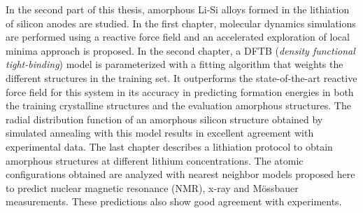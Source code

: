 In the second part of this thesis, amorphous Li-Si alloys formed in the 
lithiation of silicon anodes are studied. In the first chapter, molecular 
dynamics simulations are performed using a reactive force field and an accelerated 
exploration of local minima approach is proposed. In the second chapter, a DFTB 
(\textit{density functional tight-binding}) model is parameterized with a fitting 
algorithm that weights the different structures in the training set. It
outperforms the state-of-the-art reactive force field for this system in its 
accuracy in predicting formation energies in both the training crystalline 
structures and the evaluation amorphous structures. The radial distribution 
function of an amorphous silicon structure obtained by simulated annealing with 
this model results in excellent agreement with experimental data. The last 
chapter describes a lithiation protocol to obtain amorphous structures at 
different lithium concentrations. The atomic configurations obtained are analyzed 
with nearest neighbor models proposed here to predict nuclear magnetic resonance (NMR), x-ray and Mössbauer 
measurements. These predictions also show good agreement with experiments.
